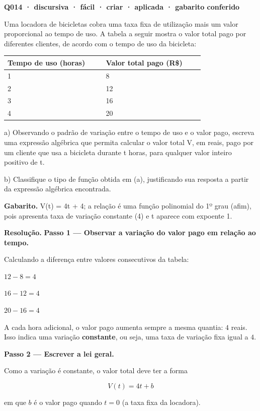 \documentclass[11pt,a4paper]{article}
\begin{document}
\bigskip\noindent\textbf{Q014 · discursiva · fácil · criar · aplicada · gabarito conferido}\par\nopagebreak
Uma locadora de bicicletas cobra uma taxa fixa de utilização mais um valor proporcional ao tempo de uso. A tabela a seguir mostra o valor total pago por diferentes clientes, de acordo com o tempo de uso da bicicleta:

\begin{center}
\begin{tabular}{|p{0.430\linewidth}|p{0.430\linewidth}|}
\hline
\textbf{Tempo de uso (horas)} & \textbf{Valor total pago (R\$)} \\
\hline
1 & 8 \\
\hline
2 & 12 \\
\hline
3 & 16 \\
\hline
4 & 20 \\
\hline
\end{tabular}
\end{center}

a) Observando o padrão de variação entre o tempo de uso e o valor pago, escreva uma expressão algébrica que permita calcular o valor total V, em reais, pago por um cliente que usa a bicicleta durante t horas, para qualquer valor inteiro positivo de t.

b) Classifique o tipo de função obtida em (a), justificando sua resposta a partir da expressão algébrica encontrada.

\textbf{Gabarito.} V(t) = 4t + 4; a relação é uma função polinomial do 1º grau (afim), pois apresenta taxa de variação constante (4) e t aparece com expoente 1.

\textbf{Resolução.} \textbf{Passo 1 — Observar a variação do valor pago em relação ao tempo.}

Calculando a diferença entre valores consecutivos da tabela:

$12-8=4$

$16-12=4$

$20-16=4$

A cada hora adicional, o valor pago aumenta sempre a mesma quantia: $4$ reais. Isso indica uma variação \textbf{constante}, ou seja, uma taxa de variação fixa igual a $4$.

\textbf{Passo 2 — Escrever a lei geral.}

Como a variação é constante, o valor total deve ter a forma

$$V(t) = 4t + b$$

em que $b$ é o valor pago quando $t=0$ (a taxa fixa da locadora).
\end{document}
